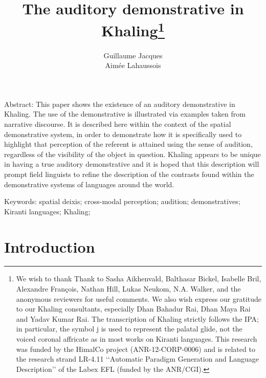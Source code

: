 \documentclass[oldfontcommands,oneside,a4paper,11pt]{article}
\newcommand{\ipa}[1]{{\phon \mbox{#1}}} %
\begin{document}
 


\title{The auditory demonstrative  in Khaling\footnote{We wish to thank Thank to  
Sasha Aikhenvald, Balthasar Bickel, Isabelle Bril, Alexandre François, Nathan Hill,  Lukas Neukom, N.A. Walker, and the anonymous reviewers for useful comments. We also wish express our gratitude to our Khaling consultants, especially Dhan Bahadur Rai, Dhan Maya Rai and Yadav Kumar Rai. The transcription of Khaling   strictly follows the IPA; in particular, the symbol \ipa{j} is used to represent the palatal glide, not the voiced coronal affricate as in most works on Kiranti languages. This research was funded by the HimalCo project (ANR-12-CORP-0006) and is related to the research strand LR-4.11 ‘‘Automatic Paradigm Generation and Language Description’’ of the Labex EFL (funded by the ANR/CGI). } } 
\author{Guillaume Jacques \\ Aimée Lahaussois}
\maketitle

Abstract: This paper shows the existence of an auditory demonstrative in Khaling.  The use of the demonstrative is illustrated via examples taken from narrative discourse.  It  is described here within the context of the spatial demonstrative system, in order to demonstrate how it is specifically used to  highlight that perception of the referent is attained using the sense of audition, regardless of the visibility of the object in question.  Khaling appears to be unique in having a true auditory demonstrative and it is hoped that this description will prompt field linguists to refine the description of the contrasts found within the demonstrative systems of languages around the world.


Keywords:   spatial deixis; cross-modal perception; audition; demonstratives; Kiranti languages; Khaling; 


\section{Introduction}
 
\end{document}
